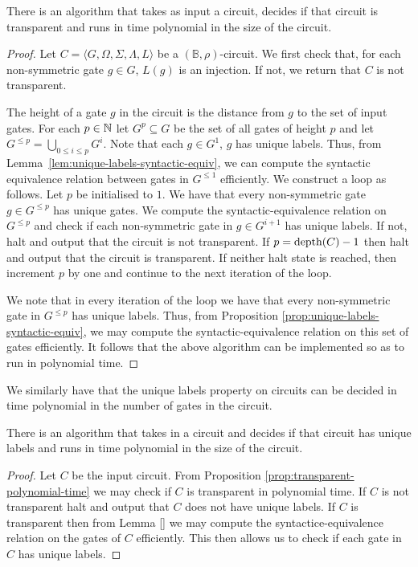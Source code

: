 \documentclass[../paper.tex]{subfiles}
\begin{document}
\begin{prop}
  There is an algorithm that takes as input a circuit, decides if that circuit
  is transparent and runs in time polynomial in the size of the circuit.
  \label{prop:transparent-polynomial-time}
\end{prop}
\begin{proof}
  Let $C = \langle G, \Omega, \Sigma, \Lambda, L \rangle$ be a $(\mathbb{B},
  \rho)$-circuit. We first check that, for each non-symmetric gate $g \in G$,
  $L(g)$ is an injection. If not, we return that $C$ is not transparent.

  The height of a gate $g$ in the circuit is the distance from $g$ to the set of
  input gates. For each $p \in \mathbb{N}$ let $G^p \subseteq G$ be the set of all
  gates of height $p$ and let $G^{\leq p} = \bigcup_{0 \leq i \leq p}G^i$. Note
  that each $g \in G^1$, $g$ has unique labels. Thus, from
  Lemma~\ref{lem:unique-labels-syntactic-equiv}, we can compute the syntactic
  equivalence relation between gates in $G^{\leq 1}$ efficiently. We construct a
  loop as follows. Let $p$ be initialised to $1$. We have that every
  non-symmetric gate $g \in G^{\leq p}$ has unique gates. We compute the
  syntactic-equivalence relation on $G^{\leq p}$ and check if each non-symmetric
  gate in $g \in G^{i + 1}$ has unique labels. If not, halt and output that the
  circuit is not transparent. If $p = \text{depth}(C) -1$ then halt and output that
  the circuit is transparent. If neither halt state is reached, then increment
  $p$ by one and continue to the next iteration of the loop.

  We note that in every iteration of the loop we have that every non-symmetric
  gate in $G^{\leq p}$ has unique labels. Thus, from Proposition
  \ref{prop:unique-labels-syntactic-equiv}, we may compute the
  syntactic-equivalence relation on this set of gates efficiently. It follows
  that the above algorithm can be implemented so as to run in polynomial time.
\end{proof}

We similarly have that the unique labels property on circuits can be decided in
time polynomial in the number of gates in the circuit.

\begin{cor}
  There is an algorithm that takes in a circuit and decides if that circuit has
  unique labels and runs in time polynomial in the size of the circuit.
\end{cor}
\begin{proof}
  Let $C$ be the input circuit. From Proposition
  \ref{prop:transparent-polynomial-time} we may check if $C$ is transparent in
  polynomial time. If $C$ is not transparent halt and output that $C$ does not
  have unique labels. If $C$ is transparent then from Lemma \ref{} we may
  compute the syntactice-equivalence relation on the gates of $C$ efficiently.
  This then allows us to check if each gate in $C$ has unique labels.
\end{proof}
\end{document}
